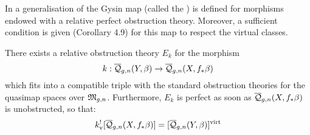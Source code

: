 In \cite{Manolache-Pull} a generalisation of the Gysin map (called the ) is defined for morphisms endowed with a relative perfect obstruction theory. Moreover, a sufficient condition is given (Corollary 4.9) for this map to respect the virtual classes.

\begin{lem} \label{Exists relative POT} There exists a relative obstruction theory $E_k$ for the morphism
\begin{equation*} k : \overline{\mathcal Q}_{g,n}(Y,\beta) \rightarrow \overline{\mathcal Q}_{g,n}(X,f_*\beta) \end{equation*}
which fits into a compatible triple with the standard obstruction theories for the quasimap spaces over $\mathfrak M_{g,n}$. Furthermore, $E_k$ is perfect as soon as $\overline{\mathcal Q}_{g,n}(X,f_*\beta)$ is unobstructed, so that:
\begin{equation*} k^!_{\text{v}} [ \overline{\mathcal Q}_{g,n}(X,f_*\beta) ] = [\overline{\mathcal Q}_{g,n}(Y,\beta)]^{\operatorname{virt}} \end{equation*} \end{lem}

